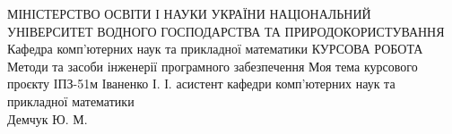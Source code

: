 \documentclass[14pt,a4paper]{extarticle}
\begin{document}
    \maketitlepage
    {МІНІСТЕРСТВО ОСВІТИ І НАУКИ УКРАЇНИ}
    {НАЦІОНАЛЬНИЙ УНІВЕРСИТЕТ ВОДНОГО ГОСПОДАРСТВА ТА ПРИРОДОКОРИСТУВАННЯ}
    {Кафедра комп’ютерних наук та прикладної математики}
    {КУРСОВА РОБОТА}
    {Методи та засоби інженерії програмного забезпечення}
    {Моя тема курсового проєкту}
    {ІПЗ-51м}
    {Іваненко І. І.}
    {асистент кафедри комп’ютерних наук та прикладної математики \\ Демчук Ю. М.}

    \newpage
    \setcounter{page}{2}
    \pagestyle{fancy}
    \tableofcontents

    
    
    
    
    
    
    
\end{document}
